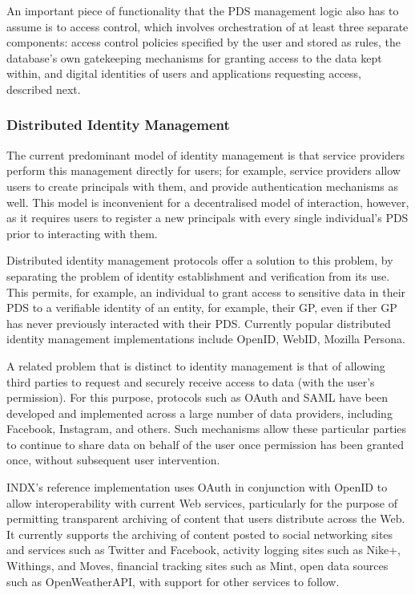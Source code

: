 \documentclass[graybox]{svmult}
\begin{document}
An important piece of functionality that the PDS management logic also has to assume is to access control, which involves orchestration of at least three separate components: access control policies specified by the user and stored as rules,  the database’s own gatekeeping mechanisms for granting access to the data kept within, and digital identities of users and applications requesting access, described next.

\subsubsection{Distributed Identity Management}
The current predominant model of identity management is that service providers perform this management directly for users; for example, service providers allow users to create principals with them, and provide authentication mechanisms as well.  This model is inconvenient for a decentralised model of interaction, however, as it requires users to register a new principals with every single individual’s PDS prior to interacting with them.

Distributed identity management protocols \cite{koshutanski2007distributed} offer a solution to this problem, by separating the problem of identity establishment and verification from its use.  This permits, for example, an individual to grant access to sensitive data in their PDS to a verifiable identity of an entity, for example, their GP, even if ther GP has never previously interacted with their PDS.  Currently popular distributed identity management implementations include OpenID\cite{recordon2006openid}, WebID\cite{huang2000webid}, Mozilla Persona\cite{williams2013sasl}.

A related problem that is distinct to identity management is that of allowing third parties to request and securely receive access to data (with the user’s permission).  For this purpose, protocols such as OAuth\cite{hardt2012oauth} and SAML\cite{armando2008formal} have been developed and implemented across a large number of data providers, including Facebook, Instagram, and others.  Such mechanisms allow these particular parties to continue to share data on behalf of the user once permission has been granted once, without subsequent user intervention.  

INDX’s reference implementation uses OAuth in conjunction with OpenID to allow interoperability with current Web services, particularly for the purpose of permitting transparent archiving of content that users distribute across the Web.  It currently supports the archiving of content posted to social networking sites and services such as Twitter and Facebook, activity logging sites such as Nike+, Withings, and Moves,  financial tracking sites such as Mint, open data sources such as OpenWeatherAPI, with support for other services to follow.
\end{document}
